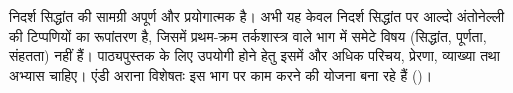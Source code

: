 \documentclass[../../include/open-logic-part]{subfiles}
\begin{document}

\begin{editorial}
  निदर्श सिद्धांत की सामग्री अपूर्ण और प्रयोगात्मक है। अभी यह केवल निदर्श
  सिद्धांत पर आल्दो अंतोनेल्ली की टिप्पणियों का रूपांतरण है, जिसमें प्रथम-क्रम
  तर्कशास्त्र वाले भाग में समेटे विषय (सिद्धांत, पूर्णता, संहतता) नहीं हैं।
  पाठ्यपुस्तक के लिए उपयोगी होने हेतु इसमें और अधिक परिचय, प्रेरणा, व्याख्या
  तथा अभ्यास चाहिए। एंडी अराना विशेषतः इस भाग पर काम करने की योजना बना रहे
  हैं ()।
\end{editorial}





\OLEndPartHook
\end{document}
